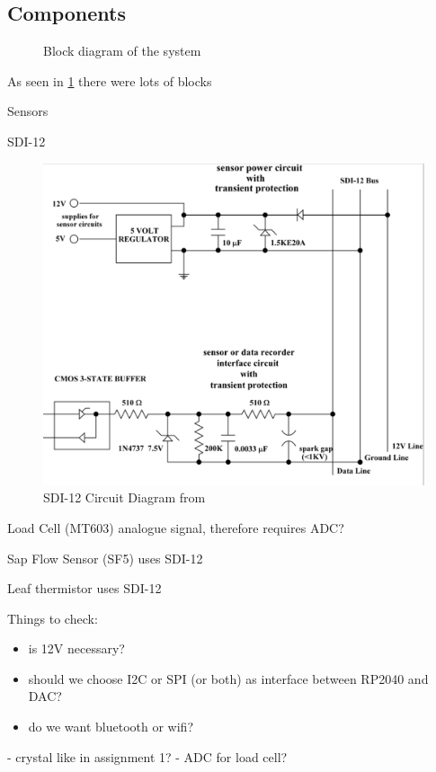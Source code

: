 \subsection{Components}


\begin{figure}
    \begin{center}
    
    \end{center}
    \caption{Block diagram of the system}
    \label{block_diagram}
\end{figure}

As seen in \cref{block_diagram} there were lots of blocks


Sensors

SDI-12

\begin{figure}
    \includegraphics[width=\linewidth]{figures/SDI-12 circuit.png}
    \caption{SDI-12 Circuit Diagram from \cite{sdi12_datasheet}}
    \label{sdi12_circuit}
\end{figure}

Load Cell (MT603)
analogue signal, therefore requires ADC?

Sap Flow Sensor (SF5)
uses SDI-12

Leaf thermistor
uses SDI-12

Things to check:
\begin{itemize}
    \item is 12V necessary?
    \item should we choose I2C or SPI (or both) as interface between RP2040 and DAC?
    \item do we want bluetooth or wifi?
  \end{itemize}
- crystal like in assignment 1?
- ADC for load cell?